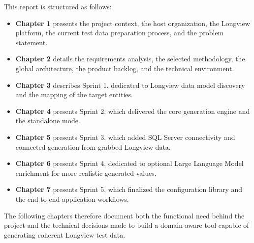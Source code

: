 This report is structured as follows:
\begin{itemize}
    \item \textbf{Chapter 1} presents the project context, the host organization, the Longview platform, the current test data preparation process, and the problem statement.
    \item \textbf{Chapter 2} details the requirements analysis, the selected methodology, the global architecture, the product backlog, and the technical environment.
    \item \textbf{Chapter 3} describes Sprint 1, dedicated to Longview data model discovery and the mapping of the target entities.
    \item \textbf{Chapter 4} presents Sprint 2, which delivered the core generation engine and the standalone mode.
    \item \textbf{Chapter 5} presents Sprint 3, which added SQL Server connectivity and connected generation from grabbed Longview data.
    \item \textbf{Chapter 6} presents Sprint 4, dedicated to optional Large Language Model enrichment for more realistic generated values.
    \item \textbf{Chapter 7} presents Sprint 5, which finalized the configuration library and the end-to-end application workflows.
\end{itemize}

The following chapters therefore document both the functional need behind the project and the technical decisions made to build a domain-aware tool capable of generating coherent Longview test data.
